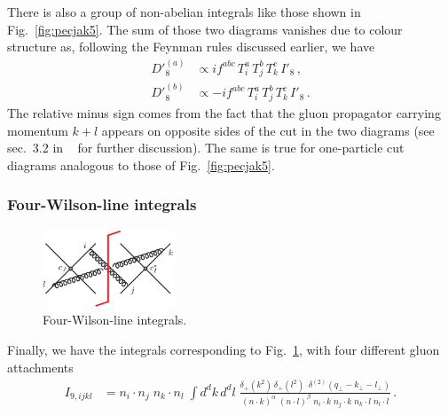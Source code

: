 \documentclass[a4paper,11pt]{report}
\numberwithin{equation}{section}
\begin{document}
There is also a group of non-abelian integrals like those shown in
Fig.~\ref{fig:pecjak5}. The sum of those two diagrams vanishes due to colour
structure as, following the Feynman rules discussed earlier, we have
%
\begin{subequations}
  \begin{align}
   D'^{(a)}_8 &\propto i f^{abc}\, T_i^a\, T_j^b\, T_k^c\, I'_8\,, \\
   D'^{(b)}_8 &\propto -i f^{abc}\, T_i^a\, T_j^b\, T_k^c\, I'_8\,.
  \end{align}
\end{subequations}
%
The relative minus sign comes from the fact that the gluon propagator carrying
momentum $k+l$ appears on opposite sides of the cut in the two diagrams
(see sec.~3.2 in ~\cite{Ferroglia:2012uy} for further discussion).
%
The same is true for one-particle cut diagrams analogous to those of
Fig.~\ref{fig:pecjak5}.



\subsubsection{Four-Wilson-line integrals}
 
\begin{figure}[t]
  \begin{center}
    \includegraphics[width=0.35\textwidth]{plots/diagram6-pecjak.png}
  \end{center}
  \caption{
    Four-Wilson-line integrals.
  }
  \label{fig:pecjak6}
\end{figure}

Finally, we have the integrals corresponding to Fig.~\ref{fig:pecjak6}, with 
four different gluon attachments~\cite{Ferroglia:2012uy}
%
\begin{align}
  \label{eq:4WLIset}
  I_{9, ijkl} &= 
  n_i \cdot n_j\; n_k \cdot n_l\; 
  \int d^d k\, d^d l\; 
  \frac{\delta_+(k^2) \, \delta_+(l^2)\,
    \; \delta^{(2)}(q_\perp-k_\perp-l_\perp)}
    {(n \cdot k)^\alpha\; (n \cdot l)^\beta \; 
    n_i \cdot k \; n_j \cdot k \; n_k \cdot l \; n_l \cdot l} \,.
\end{align}
\end{document}
